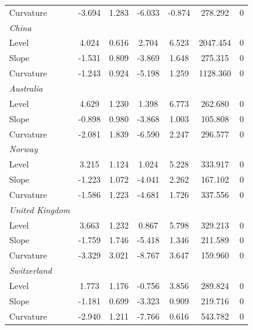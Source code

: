 \documentclass{article}
\begin{document}
\begin{table}[H]
\begin{tabular}{l c c c c c c}
\medskip													
Curvature	&	-3.694	&	1.283	&	-6.033	&	-0.874	&	278.292	&	0	\\
\textit{China}	&		&		&		&		&		&		\\
Level	&	4.024	&	0.616	&	2.704	&	6.523	&	2047.454	&	0	\\
Slope	&	-1.531	&	0.809	&	-3.869	&	1.648	&	275.315	&	0	\\
\medskip													
Curvature	&	-1.243	&	0.924	&	-5.198	&	1.259	&	1128.360	&	0	\\
\textit{Australia}	&		&		&		&		&		&		\\
Level	&	4.629	&	1.230	&	1.398	&	6.773	&	262.680	&	0	\\
Slope	&	-0.898	&	0.980	&	-3.868	&	1.003	&	105.808	&	0	\\
\medskip													
Curvature	&	-2.081	&	1.839	&	-6.590	&	2.247	&	296.577	&	0	\\
\textit{Norway}	&		&		&		&		&		&		\\
Level	&	3.215	&	1.124	&	1.024	&	5.228	&	333.917	&	0	\\
Slope	&	-1.223	&	1.072	&	-4.041	&	2.262	&	167.102	&	0	\\
\medskip													
Curvature	&	-1.586	&	1.223	&	-4.681	&	1.726	&	337.556	&	0	\\
\textit{United Kingdom}	&		&		&		&		&		&		\\
Level	&	3.663	&	1.232	&	0.867	&	5.798	&	329.213	&	0	\\
Slope	&	-1.759	&	1.746	&	-5.418	&	1.346	&	211.589	&	0	\\
\medskip													
Curvature	&	-3.329	&	3.021	&	-8.767	&	3.647	&	159.960	&	0	\\
\textit{Switzerland}	&		&		&		&		&		&		\\
Level	&	1.773	&	1.176	&	-0.756	&	3.856	&	289.824	&	0	\\
Slope	&	-1.181	&	0.699	&	-3.323	&	0.909	&	219.716	&	0	\\
Curvature	&	-2.940	&	1.211	&	-7.766	&	0.616	&	543.782	&	0	\\

\hline%
\end{tabular}
\label{table:nonlin}%
\end{table}
\end{document}
